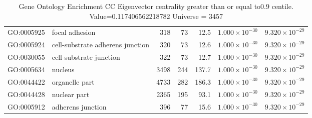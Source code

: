 \begin{table}[ht]
\begin{adjustbox}{width=\textwidth}
\begin{tabular}{llrrrrr}
  GO:0005925 & focal adhesion & 318 & 73 & 12.5 & $1.000 \times 10^{-30}$ & $9.320 \times 10^{-29}$ \\ 
  GO:0005924 & cell-substrate adherens junction & 320 & 73 & 12.6 & $1.000 \times 10^{-30}$ & $9.320 \times 10^{-29}$ \\ 
  GO:0030055 & cell-substrate junction & 322 & 73 & 12.7 & $1.000 \times 10^{-30}$ & $9.320 \times 10^{-29}$ \\ 
  GO:0005634 & nucleus & 3498 & 244 & 137.7 & $1.000 \times 10^{-30}$ & $9.320 \times 10^{-29}$ \\ 
  GO:0044422 & organelle part & 4733 & 282 & 186.3 & $1.000 \times 10^{-30}$ & $9.320 \times 10^{-29}$ \\ 
  GO:0044428 & nuclear part & 2365 & 195 & 93.1 & $1.000 \times 10^{-30}$ & $9.320 \times 10^{-29}$ \\ 
  GO:0005912 & adherens junction & 396 & 77 & 15.6 & $1.000 \times 10^{-30}$ & $9.320 \times 10^{-29}$ \\ 
   \hline
\end{tabular}
\end{adjustbox}
\caption{Gene Ontology Enrichment CC Eigenvector centrality  greater than or equal to0.9 centile.   Value=0.117406562218782 Universe = 3457} 
\label{tab:Gene Ontology Enrichment CC Eigenvector centrality  greater than or equal to0.9 centile.   Value=0.117406562218782 Universe = 3457}
\end{table}

